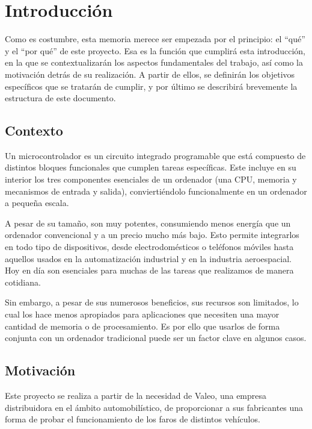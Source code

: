 \chapter{Introducción}
\label{ch:introduccion}

Como es costumbre, esta memoria merece ser empezada por el principio: el ``qué'' y el ``por qué'' de este proyecto. Esa es la función que cumplirá esta introducción, en la que se contextualizarán los aspectos fundamentales del trabajo, así como la motivación detrás de su realización. A partir de ellos, se definirán los objetivos específicos que se tratarán de cumplir, y por último se describirá brevemente la estructura de este documento.

\section{Contexto}

Un microcontrolador es un circuito integrado programable que está compuesto de distintos bloques funcionales que cumplen tareas específicas. Este incluye en su interior los tres componentes esenciales de un ordenador (una CPU, memoria y mecanismos de entrada y salida), conviertiéndolo funcionalmente en un ordenador a pequeña escala.

A pesar de su tamaño, son muy potentes, consumiendo menos energía que un ordenador convencional y a un precio mucho más bajo. Esto permite integrarlos en todo tipo de dispositivos, desde electrodomésticos o teléfonos móviles hasta aquellos usados en la automatización industrial y en la industria aeroespacial. Hoy en día son esenciales para muchas de las tareas que realizamos de manera cotidiana.

Sin embargo, a pesar de sus numerosos beneficios, sus recursos son limitados, lo cual los hace menos apropiados para aplicaciones que necesiten una mayor cantidad de memoria o de procesamiento. Es por ello que usarlos de forma conjunta con un ordenador tradicional puede ser un factor clave en algunos casos.

\section{Motivación}
\label{sec:motivacion}

Este proyecto se realiza a partir de la necesidad de Valeo, una empresa distribuidora en el ámbito automobilístico, de proporcionar a sus fabricantes una forma de probar el funcionamiento de los faros de distintos vehículos.


